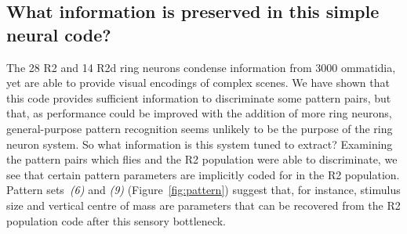 \subsection*{What information is preserved in this simple neural code?}
The 28 R2 and 14 R2d ring neurons condense information from 3000 ommatidia, yet are able to provide visual encodings of complex scenes. We have shown that this code provides sufficient information to discriminate some pattern pairs, but that, as performance could be improved with the addition of more ring neurons, general-purpose pattern recognition seems unlikely to be the purpose of the ring neuron system. So what information is this system tuned to extract? Examining the pattern pairs which flies and the R2 population were able to discriminate, we see that certain pattern parameters are implicitly coded for in the R2 population. Pattern sets~\emph{(6)} and \emph{(9)} (Figure~\ref{fig:pattern}) suggest that, for instance, stimulus size and vertical centre of mass are parameters that can be recovered from the R2 population code after this sensory bottleneck.

